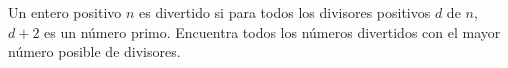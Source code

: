 Un entero positivo $n$ es divertido si para todos los divisores positivos $d$ de $n$, $d+2$ es un número primo. Encuentra todos los números divertidos con el mayor número posible de divisores.
